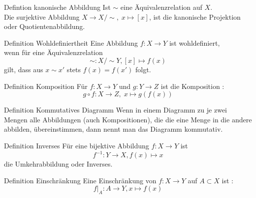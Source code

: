 \documentclass[a6paper,11pt,print,grid=front]{kartei}
\begin{document}
\begin{karte}{Defintion kanonische Abbildung}
    Ist \(\sim\) eine Äquivalenzrelation auf \(X\). \\
    Die surjektive Abbildung \(X \rightarrow X / \sim, \; x \mapsto [x]\), 
    ist die kanonische Projektion oder Quotientenabbildung. 
\end{karte}
\begin{karte}{Definition Wohldefiniertheit}
    Eine Abbildung \(f: X \rightarrow Y\) ist wohldefiniert, \\
    wenn für eine Äquivalenzrelation 
    \[\sim : X / \sim Y, [x] \mapsto f(x)\] 
    gilt, dass aus \(x \sim x\prime \) stets \(f(x) = f(x \prime)\) folgt. 
\end{karte}
\begin{karte}{Definition Komposition}
    Für \(f: X \rightarrow Y\) und \(g: Y \rightarrow Z\) ist 
    die Komposition :
    \[g \circ f : X \rightarrow Z,\; x \mapsto g(f(x))\]
\end{karte}
\begin{karte}{Definition Kommutatives Diagramm}
    Wenn in einem Diagramm zu je zwei Mengen alle Abbildungen 
    (auch Kompositionen), die die eine Menge in die andere abbilden,
    übereinstimmen, dann nennt man das Diagramm kommutativ. 
\end{karte}
\begin{karte}{Definition Inverses}
    Für eine bijektive Abbildung \(f: X \rightarrow Y\) ist
    \[f^{-1}: Y \rightarrow X, f(x) \mapsto x\] 
    die Umkehrabbildung oder Inverses.
\end{karte}
\begin{karte}{Definition Einschränkung}
    Eine Einschränkung von \(f: X \rightarrow Y\) 
    auf \(A \subset X\) ist : \\
    \[f \vert_A : A \rightarrow Y, x \mapsto f(x)\]
\end{karte}
\end{document}
